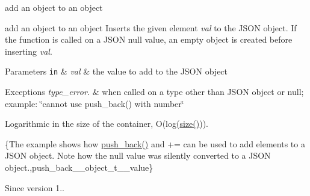 add an object to an object 

add an object to an object Inserts the given element {\itshape val} to the J\+S\+ON object. If the function is called on a J\+S\+ON null value, an empty object is created before inserting {\itshape val}.


\begin{DoxyParams}[1]{Parameters}
\mbox{\tt in}  & {\em val} & the value to add to the J\+S\+ON object\\
\hline
\end{DoxyParams}

\begin{DoxyExceptions}{Exceptions}
{\em type\+\_\+error.} & when called on a type other than J\+S\+ON object or null; example\+: {\ttfamily \char`\"{}cannot use push\+\_\+back() with number\char`\"{}}\\
\hline
\end{DoxyExceptions}
Logarithmic in the size of the container, O(log({\ttfamily \hyperlink{classnlohmann_1_1basic__json_a33c7c8638bb0b12e6d1b69d8106dd2e0}{size()}})).

\{The example shows how {\ttfamily \hyperlink{classnlohmann_1_1basic__json_ab9e0253c92736db021840105d374c4c4}{push\+\_\+back()}} and {\ttfamily +=} can be used to add elements to a J\+S\+ON object. Note how the {\ttfamily null} value was silently converted to a J\+S\+ON object.,push\+\_\+back\+\_\+\+\_\+object\+\_\+t\+\_\+\+\_\+value\}

\begin{DoxySince}{Since}
version 1.. 
\end{DoxySince}
